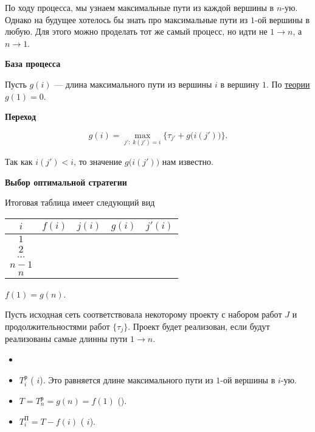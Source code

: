 \remark

По ходу процесса, мы узнаем максимальные пути из каждой вершины в $n$-ую. Однако на будущее хотелось бы знать про максимальные пути из $1$-ой вершины в любую. Для этого можно проделать тот же самый процесс, но идти не $1 \to n$, а $n \to 1$.

\bigskip

\textbf{База процесса}

Пусть $g(i)$ --- длина максимального пути из вершины $i$ в вершину $1$. По \hyperref[alg:unknown_step_process]{теории} $\boxed{g(1) = 0}$.

\bigskip

\textbf{Переход}

\[
\boxed{g(i) = \max_{j': \; k(j') = i} \Big\{\tau_{j'} + g\big(i(j')\big)\Big\}}.
\]

Так как $i(j') < i$, то значение $g\big(i(j')\big)$ нам известно.

\bigskip

\textbf{Выбор оптимальной стратегии}

Итоговая таблица имеет следующий вид

\begin{table}[H]
	\centering
	\begin{tabular}{ | c | c | c | c | c| } 
		\hline
		$i$ & $f(i)$ & $j(i)$ & $g(i)$ & $j'(i)$ \\ 
		\hline
		$1$ &&&&\\\hline
		$2$ &&&& \\\hline
		$\dots$ &&&& \\\hline
		$n-1$ &&&& \\\hline
		$n$ &&&& \\\hline
	\end{tabular}
\end{table}

\remark

$f(1) = g(n)$.

\remark

Пусть исходная сеть соответствовала некоторому проекту с набором работ $J$ и продолжительностями работ $\{\tau_j\}$. Проект будет реализован, если будут реализованы самые длинны пути $1 \to n$.

\notation

\begin{itemize}
	\item[]
	
	\item $T_i^{\text{р}}$ ( $i$). Это равняется длине максимального пути из $1$-ой вершины в $i$-ую.
	
	\item $T = T_n^{\text{р}} = g(n) = f(1)$ ().
	
	\item $T_i^{\text{П}} = T - f(i)$ ( $i$).
\end{itemize}

